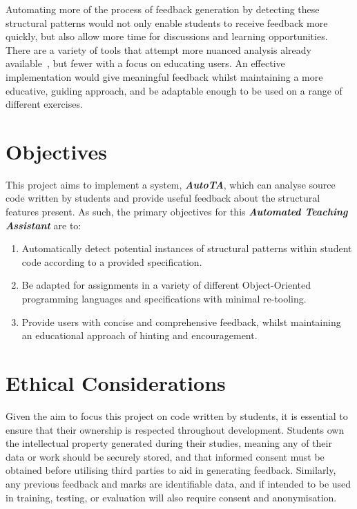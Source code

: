 Automating more of the process of feedback generation by detecting these structural patterns would not only enable students to receive feedback more quickly, but also allow more time for discussions and learning opportunities. There are a variety of tools that attempt more nuanced analysis already available~\cite{AutomatedGradingandFeedbackTools}, but fewer with a focus on educating users. An effective implementation would give meaningful feedback whilst maintaining a more educative, guiding approach, and be adaptable enough to be used on a range of different exercises.

\clearpage

\section{Objectives}
This project aims to implement a system, \textbf{\emph{AutoTA}}, which can analyse source code written by students and provide useful feedback about the structural features present. As such, the primary objectives for this \textbf{\emph{Automated Teaching Assistant}} are to:
\begin{enumerate}
    \item Automatically detect potential instances of structural patterns within student code according to a provided specification.
    \item Be adapted for assignments in a variety of different Object-Oriented programming languages and specifications with minimal re-tooling.
    \item Provide users with concise and comprehensive feedback, whilst maintaining an educational approach of hinting and encouragement.
\end{enumerate}

\section{Ethical Considerations}
Given the aim to focus this project on code written by students, it is essential to ensure that their ownership is respected throughout development. Students own the intellectual property generated during their studies, meaning any of their data or work should be securely stored, and that informed consent must be obtained before utilising third parties to aid in generating feedback. Similarly, any previous feedback and marks are identifiable data, and if intended to be used in training, testing, or evaluation will also require consent and anonymisation.

